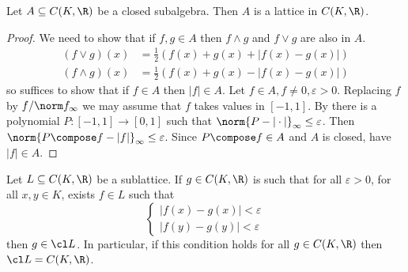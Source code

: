 \documentclass[a4paper]{article}
\begin{document}
\begin{lemma}
  Let \(A \subseteq C(K, \R)\) be a closed subalgebra. Then \(A\) is a lattice in \(C(K, \R)\).
\end{lemma}

\begin{proof}
  We need to show that if \(f, g \in A\) then \(f \wedge g\) and \(f \vee g\) are also in \(A\).
  \begin{align*}
    (f \vee g) (x) &= \frac{1}{2} (f(x) + g(x) + |f(x) - g(x)|) \\
    (f \wedge g) (x) &= \frac{1}{2} (f(x) + g(x) - |f(x) - g(x)|)
  \end{align*}
  so suffices to show that if \(f \in A\) then \(|f| \in A\). Let \(f \in A, f \neq 0, \varepsilon > 0\). Replacing \(f\) by \(f/\norm f_\infty\) we may assume that \(f\) takes values in \([-1, 1]\). By  there is a polynomial \(P: [-1, 1] \to [0, 1]\) such that \(\norm{P - |\cdot|}_\infty \leq \varepsilon\). Then \(\norm{P \compose f - |f|}_\infty \leq \varepsilon\). Since \(P \compose f \in A\) and \(A\) is closed, have \(|f| \in A\).
\end{proof}

\begin{lemma}
  \label{lem:lattice}
  Let \(L \subseteq C(K, \R)\) be a sublattice. If \(g \in C(K, \R)\) is such that for all \(\varepsilon > 0\), for all \(x, y \in K\), exists \(f \in L\) such that
  \[
    \label{eqn:lattice}
    \left\{
      \begin{array}{l}
        |f(x) - g(x)| < \varepsilon \\
        |f(y) - g(y)| < \varepsilon
      \end{array}
    \right.
    \tag{\ast}
  \]
  then \(g \in \cl L\). In particular, if this condition holds for all \(g \in C(K, \R)\) then \(\cl L = C(K, \R)\).
\end{lemma}
\end{document}
